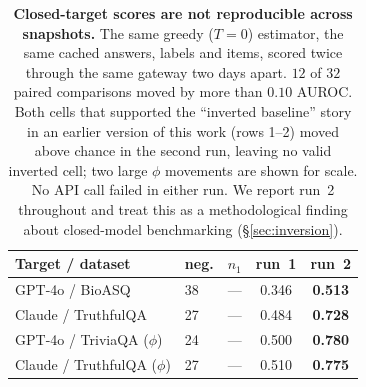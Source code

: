 \documentclass[11pt]{article}
\newcommand{\nverb}{$n_1$}     %
\begin{document}
\begin{table}[t]
\centering\small
\setlength{\tabcolsep}{4pt}
\begin{tabular}{llccc}
\toprule
Target / dataset & neg. & \nverb & run~1 & run~2 \\
\midrule
GPT-4o / BioASQ     & 38 & --- & 0.346 & \textbf{0.513} \\
Claude / TruthfulQA & 27 & --- & 0.484 & \textbf{0.728} \\
GPT-4o / TriviaQA ($\phi$) & 24 & --- & 0.500 & \textbf{0.780} \\
Claude / TruthfulQA ($\phi$) & 27 & --- & 0.510 & \textbf{0.775} \\
\bottomrule
\end{tabular}
\caption{\textbf{Closed-target scores are not reproducible across snapshots.} The same greedy
($T{=}0$) estimator, the same cached answers, labels and items, scored twice through the same
gateway two days apart. $12$ of $32$ paired comparisons moved by more than $0.10$ AUROC. Both
cells that supported the ``inverted baseline'' story in an earlier version of this work
(rows 1--2) moved above chance in the second run, leaving no valid inverted cell; two large
$\phi$ movements are shown for scale. No API call failed in either run. We report run~2
throughout and treat this as a methodological finding about closed-model benchmarking
(\S\ref{sec:inversion}).}
\label{tab:inversion}
\end{table}
\end{document}
